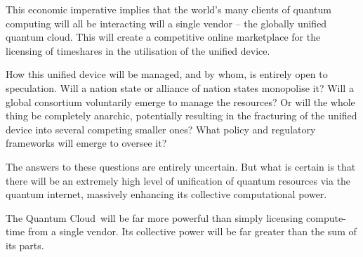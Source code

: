 This economic imperative implies that the world's many clients of quantum computing will all be interacting will a single vendor -- the globally unified quantum cloud. This will create a competitive online marketplace for the licensing of timeshares in the utilisation of the unified device.

How this unified device will be managed, and by whom, is entirely open to speculation. Will a nation state or alliance of nation states monopolise it? Will a global consortium voluntarily emerge to manage the resources? Or will the whole thing be completely anarchic, potentially resulting in the fracturing of the unified device into several competing smaller ones? What policy and regulatory frameworks will emerge to oversee it? 

The answers to these questions are entirely uncertain. But what is certain is that there will be an extremely high level of unification of quantum resources via the quantum internet, massively enhancing its collective computational power.

The Quantum Cloud\texttrademark\, will be far more powerful than simply licensing compute-time from a single vendor. Its collective power will be far greater than the sum of its parts.